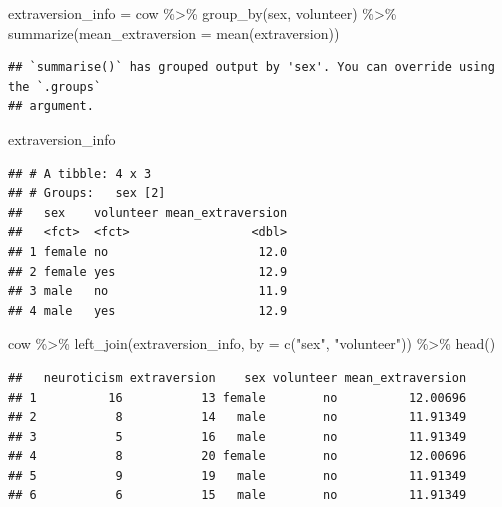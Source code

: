 \documentclass[
]{book}
\newenvironment{Shaded}{\begin{snugshade}}{\end{snugshade}}
\newcommand{\AttributeTok}[1]{\textcolor[rgb]{0.77,0.63,0.00}{#1}}
\newcommand{\FunctionTok}[1]{\textcolor[rgb]{0.00,0.00,0.00}{#1}}
\newcommand{\NormalTok}[1]{#1}
\newcommand{\OtherTok}[1]{\textcolor[rgb]{0.56,0.35,0.01}{#1}}
\newcommand{\SpecialCharTok}[1]{\textcolor[rgb]{0.00,0.00,0.00}{#1}}
\newcommand{\StringTok}[1]{\textcolor[rgb]{0.31,0.60,0.02}{#1}}
\begin{document}
\begin{Shaded}
\begin{Highlighting}[]
\NormalTok{extraversion\_info }\OtherTok{=}\NormalTok{ cow }\SpecialCharTok{\%\textgreater{}\%}
    \FunctionTok{group\_by}\NormalTok{(sex, volunteer) }\SpecialCharTok{\%\textgreater{}\%}
    \FunctionTok{summarize}\NormalTok{(}\AttributeTok{mean\_extraversion =} \FunctionTok{mean}\NormalTok{(extraversion))}
\end{Highlighting}
\end{Shaded}

\begin{verbatim}
## `summarise()` has grouped output by 'sex'. You can override using the `.groups`
## argument.
\end{verbatim}

\begin{Shaded}
\begin{Highlighting}[]
\NormalTok{extraversion\_info}
\end{Highlighting}
\end{Shaded}

\begin{verbatim}
## # A tibble: 4 x 3
## # Groups:   sex [2]
##   sex    volunteer mean_extraversion
##   <fct>  <fct>                 <dbl>
## 1 female no                     12.0
## 2 female yes                    12.9
## 3 male   no                     11.9
## 4 male   yes                    12.9
\end{verbatim}

\begin{Shaded}
\begin{Highlighting}[]
\NormalTok{cow }\SpecialCharTok{\%\textgreater{}\%}
    \FunctionTok{left\_join}\NormalTok{(extraversion\_info, }\AttributeTok{by =} \FunctionTok{c}\NormalTok{(}\StringTok{"sex"}\NormalTok{, }\StringTok{"volunteer"}\NormalTok{)) }\SpecialCharTok{\%\textgreater{}\%}
    \FunctionTok{head}\NormalTok{()}
\end{Highlighting}
\end{Shaded}

\begin{verbatim}
##   neuroticism extraversion    sex volunteer mean_extraversion
## 1          16           13 female        no          12.00696
## 2           8           14   male        no          11.91349
## 3           5           16   male        no          11.91349
## 4           8           20 female        no          12.00696
## 5           9           19   male        no          11.91349
## 6           6           15   male        no          11.91349
\end{verbatim}
\end{document}
